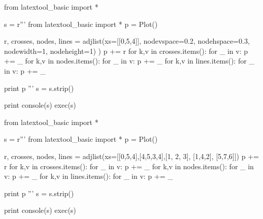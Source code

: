 \begin{python}
from latextool_basic import *

s = r'''
from latextool_basic import *
p = Plot()

r, crosses, nodes, lines = adjlist(xs=[[0,5,4]],
                                   nodevspace=0.2, nodehspace=0.3,
                                   nodewidth=1, nodeheight=1)
)
p += r
for k,v in crosses.items():
    for _ in v: p += _
for k,v in nodes.items():
    for _ in v: p += _
for k,v in lines.items():
    for _ in v: p += _

print p
'''
s = s.strip()

print console(s)
exec(s)
\end{python}






\begin{python}
from latextool_basic import *

s = r'''
from latextool_basic import *
p = Plot()

r, crosses, nodes, lines = adjlist(xs=[[0,5,4],[4,5,3,4],[1, 2, 3], [1,4,2], [5,7,6]])
p += r
for k,v in crosses.items():
    for _ in v: p += _
for k,v in nodes.items():
    for _ in v: p += _
for k,v in lines.items():
    for _ in v: p += _

print p
'''
s = s.strip()

print console(s)
exec(s)
\end{python}

